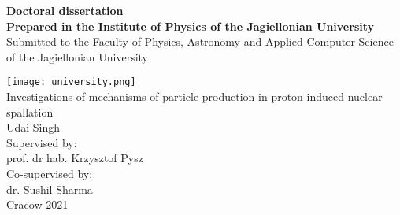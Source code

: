 \begin{titlepage}
	\begin{center}
		\vspace*{1cm}
		\textbf{\Large Doctoral dissertation}\\[0.5cm]	
		\textbf{Prepared in the Institute of Physics
			of the Jagiellonian University}\\[0.5cm]	
		Submitted to the Faculty of Physics,
		Astronomy and Applied Computer Science
		of the Jagiellonian University

		\vspace{1.0cm}
		{\texttt{[image: university.png]}}	\\
		\vspace{1.0cm}
		\Large Investigations of mechanisms of particle production in proton-induced nuclear spallation  \\
		\vspace{0.5cm}
		\Large Udai Singh\\
		\vspace{0.5cm}
		\large Supervised by:\\
		prof. dr hab. Krzysztof Pysz\\
		\vspace{0.5cm}
		Co-supervised by:\\
		dr. Sushil Sharma\\
			\vfill
		Cracow 2021
	\end{center}
\end{titlepage}